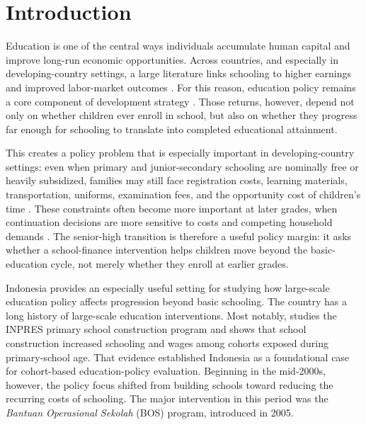 \documentclass[a4paper, 12pt]{article}
\begin{document}
\section{Introduction}
\begin{doublespacing}
Education is one of the central ways individuals accumulate human capital and improve long-run economic opportunities. Across countries, and especially in developing-country settings, a large literature links schooling to higher earnings and improved labor-market outcomes \citep{PsacharopoulosPatrinos2018,Duflo2001,Delesalle2021}. For this reason, education policy remains a core component of development strategy \citep{HanushekWoessmann2007,GlewweMuralidharan2016}. Those returns, however, depend not only on whether children ever enroll in school, but also on whether they progress far enough for schooling to translate into completed educational attainment.

This creates a policy problem that is especially important in developing-country settings: even when primary and junior-secondary schooling are nominally free or heavily subsidized, families may still face registration costs, learning materials, transportation, uniforms, examination fees, and the opportunity cost of children's time \citep{GlewweMuralidharan2016,DufloDupasKremer2021}. These constraints often become more important at later grades, when continuation decisions are more sensitive to costs and competing household demands \citep{FilmerSchady2014,DufloDupasKremer2021}. The senior-high transition is therefore a useful policy margin: it asks whether a school-finance intervention helps children move beyond the basic-education cycle, not merely whether they enroll at earlier grades.

Indonesia provides an especially useful setting for studying how large-scale education policy affects progression beyond basic schooling. The country has a long history of large-scale education interventions. Most notably, \citet{Duflo2001} studies the INPRES primary school construction program and shows that school construction increased schooling and wages among cohorts exposed during primary-school age. That evidence established Indonesia as a foundational case for cohort-based education-policy evaluation. Beginning in the mid-2000s, however, the policy focus shifted from building schools toward reducing the recurring costs of schooling. The major intervention in this period was the \textit{Bantuan Operasional Sekolah} (BOS) program, introduced in 2005.


\end{doublespacing}
\end{document}
